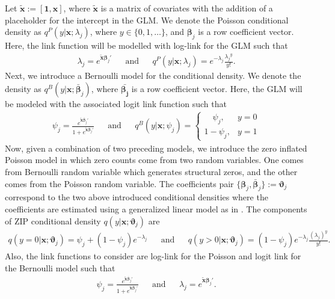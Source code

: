 \documentclass[11pt,letterpaper]{article}
\numberwithin{equation}{section}
\numberwithin{equation}{section}
\numberwithin{equation}{section}
\begin{document}
\newcommand{\xTilda}{\bm{\tilde{x}}}
Let $ \xTilda := [\bm{1},\bm{x}]$, where $\xTilda $ is a matrix of covariates with the addition of a placeholder for the intercept in the GLM. We denote the Poisson conditional density  as $ q^P(y|\bm{x}; \lambda_j) $, where $y \in \{0,1,\dots\}$, and  $\bm{\beta}_j$ is a row coefficient vector.
Here, the link function will be modelled with log-link for the GLM such that
 \begin{align*}
\lambda_j = e^{\xTilda \bm{\beta}_j'} && \text{and} & & %
q^P(y|\bm{ x} ; \lambda_{j} ) = e^{-\lambda_j} \frac{{\lambda_j}^y}{y!}.
 \end{align*}
Next, we introduce a Bernoulli model for the conditional density. We denote the density as  $ q^{B}(y|\bm{x}; \bm{\bar{\beta}}_j) $, where $\bm{\bar{\beta_j}}$ is a row coefficient vector.  Here, the GLM will be modeled with the associated logit link function such that
 \begin{align*}
 \psi_j =  \frac{e^{\xTilda \bm{\bar{\beta}}_j'}}{1+ e^{\xTilda  \bm{\bar{\beta}}_j'}}  && \text{and} && 
 q^B(y | \bm{x} ; {\psi}_j) = \begin{cases}
      \quad \psi_j, & y = 0\\
     1 -  \psi_j,  & y = 1
   \end{cases}
 \end{align*}
 Now, given a combination of two preceding models, we introduce the zero inflated Poisson model in which zero counts come from two random variables. One comes from Bernoulli random variable which generates structural zeros, and the other comes from the Poisson random variable. The coefficients pair $  \{ \bm{\beta}_{j},  \bm{\bar{\beta}}_j \} := \bm{\vartheta}_{j} $ correspond to the two above introduced conditional densities where the coefficients are estimated using a generalized linear model as in \cite{Lambert}. The components of ZIP conditional density $q(y|\bm{x}; \bm{\vartheta}_{j}  )$ are %
 \begin{align*}
 q( y = 0| \bm{x} ; \bm{ \vartheta}_{j}  ) = \psi_j + (1 - \psi_j)e^{-\lambda_j}  & &  \text{and}  & &
q(y > 0 |  \bm{x} ; \bm{ \vartheta}_{j}  ) = (1 - \psi_j)e^{-\lambda_j} \frac{\left(\lambda_j \right)^y  }{y!}.
 \end{align*}
Also, the link functions to consider are log-link for the Poisson and logit link for the Bernoulli model such that
 \begin{align*}
 \psi_j =  \frac{e^{\xTilda \bm{\bar{\beta}}_j'}}{1+ e^{\xTilda \bm{\bar{\beta}}_j'}}  & & \text{and} & &
\lambda_j  = e^{\xTilda \bm{\beta}_j'}.
 \end{align*}
\end{document}

